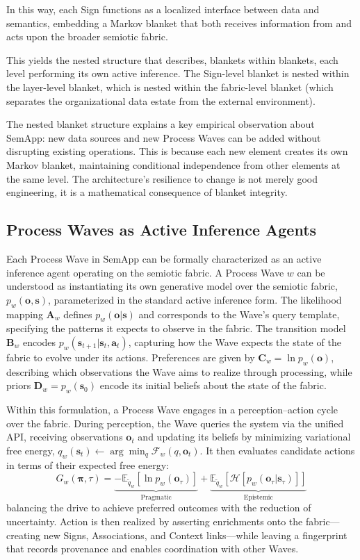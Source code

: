 \documentclass[11pt,a4paper]{article}
\theoremstyle{definition}
\newcommand{\E}{\mathbb{E}}
\newcommand{\bq}{q}
\newcommand{\bp}{p}
\newcommand{\bo}{\bm{o}}
\newcommand{\bs}{\bm{s}}
\newcommand{\ba}{\bm{a}}
\newcommand{\bpi}{\bm{\pi}}
\begin{document}
In this way, each Sign functions as a localized interface between data and semantics, embedding a Markov blanket that both receives information from and acts upon the broader semiotic fabric.

This yields the nested structure that \citet{friston2019particular} describes, blankets within blankets, each level performing its own active inference. The Sign-level blanket is nested within the layer-level blanket, which is nested within the fabric-level blanket (which separates the organizational data estate from the external environment).

The nested blanket structure explains a key empirical observation about SemApp: new data sources and new Process Waves can be added without disrupting existing operations. This is because each new element creates its own Markov blanket, maintaining conditional independence from other elements at the same level. The architecture's resilience to change is not merely good engineering, it is a mathematical consequence of blanket integrity.



\subsection{Process Waves as Active Inference Agents}
\label{sec:waves}

Each Process Wave in SemApp can be formally characterized as an active inference agent operating on the semiotic fabric.
A Process Wave $w$ can be understood as instantiating its own generative model over the semiotic fabric, $\bp_w(\bo, \bs)$, parameterized in the standard active inference form. The likelihood mapping $\mathbf{A}_w$ defines $\bp_w(\bo|\bs)$ and corresponds to the Wave’s query template, specifying the patterns it expects to observe in the fabric. The transition model $\mathbf{B}_w$ encodes $\bp_w(\bs_{t+1}|\bs_t, \ba_t)$, capturing how the Wave expects the state of the fabric to evolve under its actions. Preferences are given by $\mathbf{C}_w = \ln \bp_w(\bo)$, describing which observations the Wave aims to realize through processing, while priors $\mathbf{D}_w = \bp_w(\bs_0)$ encode its initial beliefs about the state of the fabric.

Within this formulation, a Process Wave engages in a perception–action cycle over the fabric. During perception, the Wave queries the system via the unified API, receiving observations $\bo_t$ and updating its beliefs by minimizing variational free energy, $\bq_w(\bs_t) \leftarrow \arg\min_{\bq} \mathcal{F}_w(\bq, \bo_t)$. It then evaluates candidate actions in terms of their expected free energy:
\begin{equation}
G_w(\bpi, \tau) = \underbrace{-\E_{\tilde{\bq}_w}\!\left[\ln \bp_w(\bo_\tau)\right]}_{\text{Pragmatic}} + \underbrace{\E_{\tilde{\bq}_w}\!\left[\mathcal{H}\!\left[\bp_w(\bo_\tau|\bs_\tau)\right]\right]}_{\text{Epistemic}}
\end{equation}
balancing the drive to achieve preferred outcomes with the reduction of uncertainty. Action is then realized by asserting enrichments onto the fabric—creating new Signs, Associations, and Context links—while leaving a fingerprint that records provenance and enables coordination with other Waves.
\end{document}
